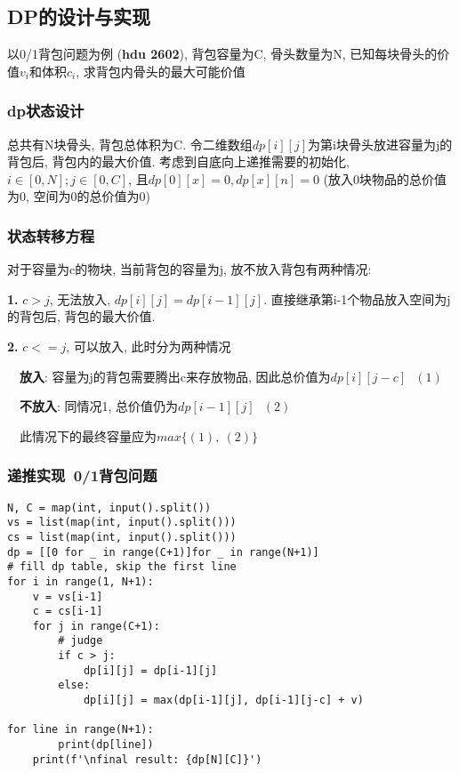 \documentclass[../main]{subfiles}
\begin{document}
\begin{sloppy}
\newpage
\subsection{DP的设计与实现}

以0/1背包问题为例 (\textbf{hdu 2602}), 背包容量为C, 骨头数量为N, 已知每块骨头的价值$v_i$和体积$c_i$, 求背包内骨头的最大可能价值

\subsubsection{dp状态设计}

总共有N块骨头, 背包总体积为C. 令二维数组$dp[i][j]$为第i块骨头放进容量为j的背包后, 背包内的最大价值. 考虑到自底向上递推需要的初始化, $i \in [0, N]; j \in [0, C]$, 且$dp[0][x] = 0, dp[x][n] = 0$ (放入0块物品的总价值为0, 空间为0的总价值为0)

\subsubsection{状态转移方程}

对于容量为c的物块, 当前背包的容量为j, 放不放入背包有两种情况:

\textbf{1.} $c > j$, 无法放入, $dp[i][j] = dp[i-1][j]$. 直接继承第i-1个物品放入空间为j的背包后, 背包的最大价值.

\textbf{2.} $c <= j$, 可以放入, 此时分为两种情况

\ \ \textbf{放入}: 容量为j的背包需要腾出c来存放物品, 因此总价值为$dp[i][j-c]\ \ \ (1)$

\ \ \textbf{不放入}: 同情况1, 总价值仍为$dp[i-1][j]\ \ \ (2)$

\ \ 此情况下的最终容量应为$max\{(1),\ (2)\}$

\subsubsection{递推实现\ 0/1背包问题}

\begin{lstlisting}[style = Python]
N, C = map(int, input().split())
vs = list(map(int, input().split()))
cs = list(map(int, input().split())) 
dp = [[0 for _ in range(C+1)]for _ in range(N+1)]
# fill dp table, skip the first line
for i in range(1, N+1):
    v = vs[i-1]
    c = cs[i-1]
    for j in range(C+1):
        # judge 
        if c > j:
            dp[i][j] = dp[i-1][j]
        else:
            dp[i][j] = max(dp[i-1][j], dp[i-1][j-c] + v)

for line in range(N+1):
        print(dp[line])
    print(f'\nfinal result: {dp[N][C]}')
\end{lstlisting}


\end{sloppy}
\end{document}
